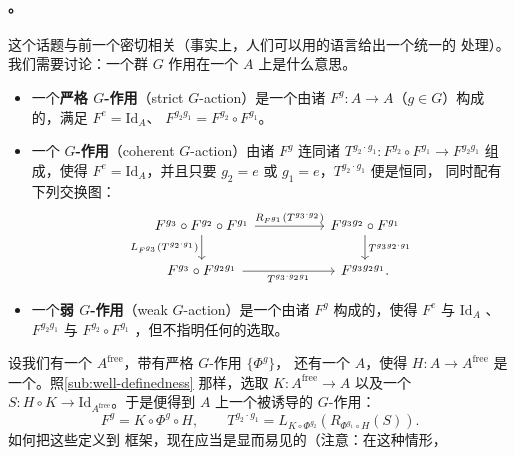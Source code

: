 \paragraph{\trAutoequivalence。}\label{sub:autoequivalences}
这个话题与前一个密切相关（事实上，人们可以用\trGroupoid{}的语言给出一个统一的%
处理）。我们需要讨论：一个群 $G$ 作用在一个\trCategory{} $A$ 上是什么意思。
\begin{itemize}
\item 一个\textbf{严格 $G$-作用}（strict $G$-action）是一个由诸\trFunctor{}
$F^g\colon A\to A$（$g\in G$）构成的\trFamily，满足 $F^e=\mathrm{Id}_A$、
$F^{g_2g_1}=F^{g_2}\circ F^{g_1}$。
\item 一个\textbf{\trCoherent{} $G$-作用}（coherent $G$-action）由诸\trFunctor{} $F^g$
连同诸\trIsomorphism{}
$T^{g_2\cdot g_1}\colon F^{g_2}\circ F^{g_1}\to F^{g_2g_1}$ 组成，使得
$F^e=\mathrm{Id}_A$，并且只要 $g_2=e$ 或 $g_1=e$，$T^{g_2\cdot g_1}$ 便是恒同，
同时配有下列交换图：
\begin{equation}\label{eq:coherent-group-action-square}
\begin{tikzcd}[column sep=5em]
F^{g_3}\circ F^{g_2}\circ F^{g_1}
  \ar[r,"{R_{F^{g_1}}(T^{g_3\cdot g_2})}"]
  \ar[d,"{L_{F^{g_3}}(T^{g_2\cdot g_1})}"']
& F^{g_3g_2}\circ F^{g_1}
  \ar[d,"{T^{g_3g_2\cdot g_1}}"] \\
F^{g_3}\circ F^{g_2g_1}
  \ar[r,"{T^{g_3\cdot g_2g_1}}"']
& F^{g_3g_2g_1}.
\end{tikzcd}
\end{equation}
\item 一个\textbf{弱 $G$-作用}（weak $G$-action）是一个由诸\trFunctor{} $F^g$
构成的\trFamily，使得 $F^e$ 与 $\mathrm{Id}_A$ \trIsomorphic、$F^{g_2g_1}$ 与
$F^{g_2}\circ F^{g_1}$ \trIsomorphic，但不指明任何\trIsomorphism{}的选取。
\end{itemize}
设我们有一个\trCategory{} $A^{\mathrm{free}}$，带有严格 $G$-作用 $\{\Phi^g\}$，%
还有一个\trFullSubcategory{} $A$，使得\trEmbedding{} $H\colon A\to A^{\mathrm{free}}$
是一个\trEquivalence。照\cref{sub:well-definedness} 那样，选取
$K\colon A^{\mathrm{free}}\to A$ 以及一个\trFunctor\trIsomorphism{}
$S\colon H\circ K\to\mathrm{Id}_{A^{\mathrm{free}}}$。于是便得到 $A$ 上一个被诱导的%
\trCoherent{} $G$-作用：
\begin{equation}\label{eq:induced-coherent-action}
F^g=K\circ\Phi^g\circ H,\qquad
T^{g_2\cdot g_1}=L_{K\circ\Phi^{g_2}}(R_{\Phi^{g_1}\circ H}(S)).
\end{equation}
如何把这些定义\trAdapted{}到 \trAinfty{}框架，现在应当是显而易见的（注意：在这种情形，%
